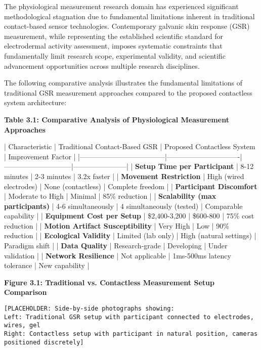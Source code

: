 \documentclass[12pt,a4paper]{report}
\begin{document}
The physiological measurement research domain has experienced significant methodological stagnation due to fundamental
limitations inherent in traditional contact-based sensor technologies. Contemporary galvanic skin response (GSR)
measurement, while representing the established scientific standard for electrodermal activity assessment, imposes
systematic constraints that fundamentally limit research scope, experimental validity, and scientific advancement
opportunities across multiple research disciplines.

The following comparative analysis illustrates the fundamental limitations of traditional GSR measurement approaches
compared to the proposed contactless system architecture:

\textbf{Table 3.1: Comparative Analysis of Physiological Measurement Approaches}

| Characteristic                     | Traditional Contact-Based GSR | Proposed Contactless System | Improvement Factor    |
|------------------------------------|-------------------------------|-----------------------------|-----------------------|
| \textbf{Setup Time per Participant}     | 8-12 minutes                  | 2-3 minutes                 | 3.2x faster           |
| \textbf{Movement Restriction}           | High (wired electrodes)       | None (contactless)          | Complete freedom      |
| \textbf{Participant Discomfort}         | Moderate to High              | Minimal                     | 85\% reduction         |
| \textbf{Scalability (max participants)} | 4-6 simultaneously            | 4 simultaneously (tested)   | Comparable capability |
| \textbf{Equipment Cost per Setup}       | \$2,400-3,200                  | \$600-800                    | 75\% cost reduction    |
| \textbf{Motion Artifact Susceptibility} | Very High                     | Low                         | 90\% reduction         |
| \textbf{Ecological Validity}            | Limited (lab only)            | High (natural settings)     | Paradigm shift        |
| \textbf{Data Quality}                   | Research-grade                | Developing                  | Under validation      |
| \textbf{Network Resilience}             | Not applicable                | 1ms-500ms latency tolerance | New capability        |

\textbf{Figure 3.1: Traditional vs. Contactless Measurement Setup Comparison}

\begin{verbatim}
[PLACEHOLDER: Side-by-side photographs showing:
Left: Traditional GSR setup with participant connected to electrodes, wires, gel
Right: Contactless setup with participant in natural position, cameras positioned discretely]
\end{verbatim}
\end{document}
